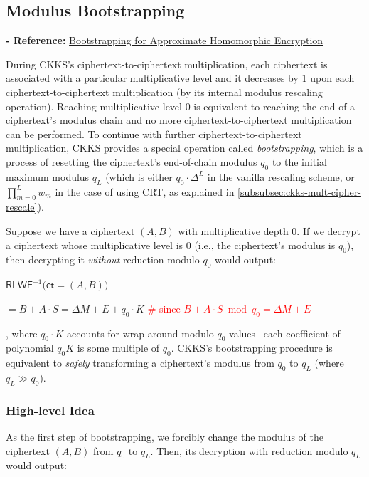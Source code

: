 \subsection{Modulus Bootstrapping}
\label{subsec:ckks-bootstrapping}


\textbf{- Reference:} 
\href{https://eprint.iacr.org/2018/153.pdf}{Bootstrapping for Approximate Homomorphic Encryption}~\cite{ckks}



During CKKS's ciphertext-to-ciphertext multiplication, each ciphertext is associated with a particular multiplicative level and it decreases by 1 upon each ciphertext-to-ciphertext multiplication (by its internal modulus rescaling operation). Reaching multiplicative level 0 is equivalent to reaching the end of a ciphertext's modulus chain and no more ciphertext-to-ciphertext multiplication can be performed. To continue with further ciphertext-to-ciphertext multiplication, CKKS provides a special operation called \textit{bootstrapping}, which is a process of resetting the ciphertext's end-of-chain modulus $q_0$ to the initial maximum modulus $q_L$ (which is either $q_0\cdot\Delta^{L}$ in the vanilla rescaling scheme, or $\prod\limits_{m=0}^{L}w_m$ in the case of using CRT, as explained in \autoref{subsubsec:ckks-mult-cipher-rescale}). 


Suppose we have a ciphertext $(A, B)$ with multiplicative depth 0. If we decrypt a ciphertext whose multiplicative level is 0 (i.e., the ciphertext's modulus is $q_0$), then decrypting it \textit{without} reduction modulo $q_0$ would output:

$\textsf{RLWE}^{-1}\textbf{(}\textsf{ct} = (A, B)\textbf{)}$

$ = B + A\cdot S = \Delta M + E + q_0\cdot K$ \textcolor{red}{ \# since $B + A\cdot S \bmod q_0 = \Delta M + E$}

, where $q_0 \cdot K$ accounts for wrap-around modulo $q_0$ values-- each coefficient of polynomial $q_0K$ is some multiple of $q_0$. CKKS's bootstrapping procedure is equivalent to \textit{safely} transforming a ciphertext's modulus from $q_0$ to $q_L$ (where $q_L \gg q_0$).



\subsubsection{High-level Idea}
\label{subsubsec:ckks-bootstrapping-high-level}

As the first step of bootstrapping, we forcibly change the modulus of the ciphertext $(A, B)$ from $q_0$ to $q_L$. Then, its decryption with reduction modulo $q_L$ would output:

